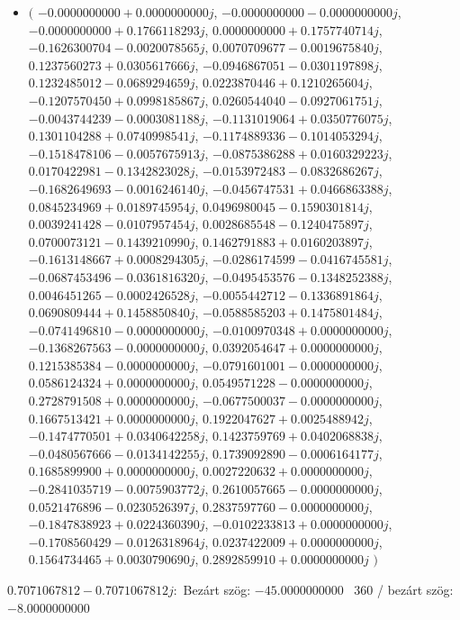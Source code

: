 \documentclass[14pt,a4paper]{article}
\begin{document}
\begin{itemize}
\item
$\big($
$-0.0000000000+0.0000000000j$, $-0.0000000000-0.0000000000j$, $-0.0000000000+0.1766118293j$, $0.0000000000+0.1757740714j$, $-0.1626300704-0.0020078565j$, $0.0070709677-0.0019675840j$, $0.1237560273+0.0305617666j$, $-0.0946867051-0.0301197898j$, $0.1232485012-0.0689294659j$, $0.0223870446+0.1210265604j$, $-0.1207570450+0.0998185867j$, $0.0260544040-0.0927061751j$, $-0.0043744239-0.0003081188j$, $-0.1131019064+0.0350776075j$, $0.1301104288+0.0740998541j$, $-0.1174889336-0.1014053294j$, $-0.1518478106-0.0057675913j$, $-0.0875386288+0.0160329223j$, $0.0170422981-0.1342823028j$, $-0.0153972483-0.0832686267j$, $-0.1682649693-0.0016246140j$, $-0.0456747531+0.0466863388j$, $0.0845234969+0.0189745954j$, $0.0496980045-0.1590301814j$, $0.0039241428-0.0107957454j$, $0.0028685548-0.1240475897j$, $0.0700073121-0.1439210990j$, $0.1462791883+0.0160203897j$, $-0.1613148667+0.0008294305j$, $-0.0286174599-0.0416745581j$, $-0.0687453496-0.0361816320j$, $-0.0495453576-0.1348252388j$, $0.0046451265-0.0002426528j$, $-0.0055442712-0.1336891864j$, $0.0690809444+0.1458850840j$, $-0.0588585203+0.1475801484j$, $-0.0741496810-0.0000000000j$, $-0.0100970348+0.0000000000j$, $-0.1368267563-0.0000000000j$, $0.0392054647+0.0000000000j$, $0.1215385384-0.0000000000j$, $-0.0791601001-0.0000000000j$, $0.0586124324+0.0000000000j$, $0.0549571228-0.0000000000j$, $0.2728791508+0.0000000000j$, $-0.0677500037-0.0000000000j$, $0.1667513421+0.0000000000j$, $0.1922047627+0.0025488942j$, $-0.1474770501+0.0340642258j$, $0.1423759769+0.0402068838j$, $-0.0480567666-0.0134142255j$, $0.1739092890-0.0006164177j$, $0.1685899900+0.0000000000j$, $0.0027220632+0.0000000000j$, $-0.2841035719-0.0075903772j$, $0.2610057665-0.0000000000j$, $0.0521476896-0.0230526397j$, $0.2837597760-0.0000000000j$, $-0.1847838923+0.0224360390j$, $-0.0102233813+0.0000000000j$, $-0.1708560429-0.0126318964j$, $0.0237422009+0.0000000000j$, $0.1564734465+0.0030790690j$, $0.2892859910+0.0000000000j$
$\big)$
\end{itemize}
$0.7071067812-0.7071067812j$:\
Bezárt szög: $-45.0000000000$ \
360 / bezárt szög: $-8.0000000000$\
\end{document}
